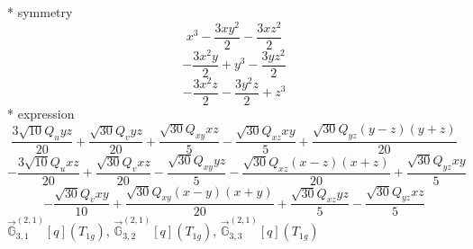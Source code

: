\documentclass[fleqn,8pt]{jsarticle}
\begin{document}
\noindent\quad ** symmetry
\begin{dmath*}
x^{3} - \frac{3 x y^{2}}{2} - \frac{3 x z^{2}}{2}
\end{dmath*}
\begin{dmath*}
- \frac{3 x^{2} y}{2} + y^{3} - \frac{3 y z^{2}}{2}
\end{dmath*}
\begin{dmath*}
- \frac{3 x^{2} z}{2} - \frac{3 y^{2} z}{2} + z^{3}
\end{dmath*}
\noindent\quad ** expression
\begin{dmath*}
\frac{3 \sqrt{10} Q_{u} y z}{20} + \frac{\sqrt{30} Q_{v} y z}{20} + \frac{\sqrt{30} Q_{xy} x z}{5} - \frac{\sqrt{30} Q_{xz} x y}{5} + \frac{\sqrt{30} Q_{yz} \left(y - z\right) \left(y + z\right)}{20}
\end{dmath*}
\begin{dmath*}
- \frac{3 \sqrt{10} Q_{u} x z}{20} + \frac{\sqrt{30} Q_{v} x z}{20} - \frac{\sqrt{30} Q_{xy} y z}{5} - \frac{\sqrt{30} Q_{xz} \left(x - z\right) \left(x + z\right)}{20} + \frac{\sqrt{30} Q_{yz} x y}{5}
\end{dmath*}
\begin{dmath*}
- \frac{\sqrt{30} Q_{v} x y}{10} + \frac{\sqrt{30} Q_{xy} \left(x - y\right) \left(x + y\right)}{20} + \frac{\sqrt{30} Q_{xz} y z}{5} - \frac{\sqrt{30} Q_{yz} x z}{5}
\end{dmath*}
\noindent\quad $\vec{\mathbb{G}}_{3,1}^{(2,1)}[q](T_{1g})$, $\vec{\mathbb{G}}_{3,2}^{(2,1)}[q](T_{1g})$, $\vec{\mathbb{G}}_{3,3}^{(2,1)}[q](T_{1g})$
\end{document}
